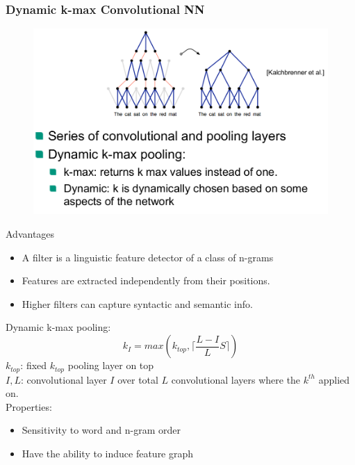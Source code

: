 \subsubsection{Dynamic k-max Convolutional NN}
\label{sssect:dcnn}
\begin{figure}[h]
\includegraphics[scale=0.4]{DCNN}
\end{figure}
Advantages
\begin{itemize}
\item A filter is a linguistic feature detector of a class of n-grams
\item Features are extracted independently from their positions.
\item Higher filters can capture syntactic and semantic info.
\end{itemize}
Dynamic k-max pooling:
\[
k_I = max(k_{top}, \lceil \frac{L - I}{L} S \rceil)
\]
$k_{top}$: fixed $k_{top}$ pooling layer on top\\
$I, L$: convolutional layer $I$ over total $L$ convolutional layers where the $k^{th}$ applied on.\\
Properties:
\begin{itemize}
\item Sensitivity to word and n-gram order
\item Have the ability to induce feature graph
\end{itemize}
\newpage